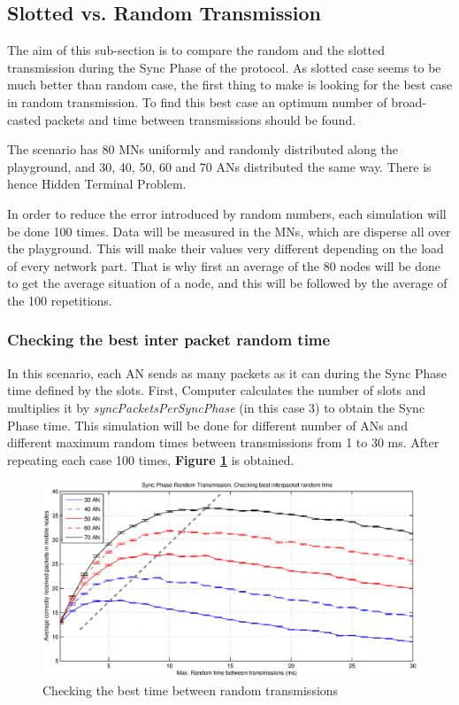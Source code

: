 \subsection{Slotted vs. Random Transmission}

The aim of this sub-section is to compare the random and the slotted transmission during the Sync Phase of the protocol. As slotted case seems to be
much better than random case, the first thing to make is looking for the best case in random transmission. To find this best case an optimum number
of broad-casted packets and time between transmissions should be found.

The scenario has 80 \acp{MN} uniformly and randomly distributed along the playground, and 30, 40, 50, 60 and 70 \acp{AN} distributed the same way.
There is hence Hidden Terminal Problem.

In order to reduce the error introduced by random numbers, each simulation will be done 100 times. Data will be measured in the \acp{MN}, which
are disperse all over the playground. This will make their values very different depending on the load of every network part. That is why first 
an average of the 80 nodes will be done to get the average situation of a node, and this will be followed by the average of the 100 repetitions.

\subsubsection{Checking the best inter packet random time}

In this scenario, each \ac{AN} sends as many packets as it can during the Sync Phase time defined by the slots. First, Computer calculates the number of
slots and multiplies it by \textit{syncPacketsPerSyncPhase} (in this case 3) to obtain the Sync Phase time. This simulation will be done for different
number of \acp{AN} and different maximum random times between transmissions from 1 to 30 ms. After repeating each case 100 times,
\textbf{Figure \ref{fig:randomTimeCheckingTheBestInterpacketRandomTime}} is obtained.

\begin{figure}[ht]
 \begin{center}
  \includegraphics[width=1\textwidth]{randomTimeCheckingTheBestInterpacketRandomTime.eps}
 \end{center}
 \caption{Checking the best time between random transmissions}
 \label{fig:randomTimeCheckingTheBestInterpacketRandomTime}
\end{figure}

